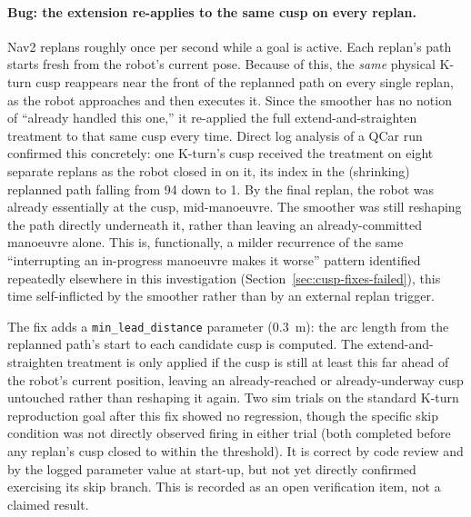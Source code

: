 \paragraph{Bug: the extension re-applies to the same cusp on every replan.} Nav2 replans roughly once per second while a goal is
active. Each replan's path starts fresh from the robot's current
pose. Because of this, the \emph{same} physical K-turn cusp reappears
near the front of the replanned path on every single replan, as the
robot approaches and then executes it. Since the smoother has no
notion of ``already handled this one,'' it re-applied the full
extend-and-straighten treatment to that same cusp every time. Direct
log analysis of a QCar run confirmed this concretely: one
K-turn's cusp received the treatment on eight separate replans as the
robot closed in on it, its index in the (shrinking) replanned path
falling from 94 down to 1. By the final replan, the robot was already
essentially at the cusp, mid-manoeuvre. The smoother was still
reshaping the path directly underneath it, rather than leaving an
already-committed manoeuvre alone. This is, functionally, a milder
recurrence of the same
``interrupting an in-progress manoeuvre makes it worse'' pattern
identified repeatedly elsewhere in this investigation
(Section~\ref{sec:cusp-fixes-failed}), this time self-inflicted by the
smoother rather than by an external replan trigger.

The fix adds a \texttt{min\_lead\_distance} parameter (\SI{0.3}{\meter}):
the arc length from the replanned path's start to each candidate cusp
is computed. The extend-and-straighten treatment is only applied
if the cusp is still at least this far ahead of the robot's current
position, leaving an already-reached or already-underway cusp
untouched rather than reshaping it again. Two sim trials on the
standard K-turn reproduction goal after this fix showed no
regression, though the specific skip condition was not directly
observed firing in either trial (both completed before any replan's
cusp closed to within the threshold). It is correct by code review
and by the logged parameter value at start-up, but not yet directly
confirmed exercising its skip branch. This is recorded as an open
verification item, not a claimed result.

